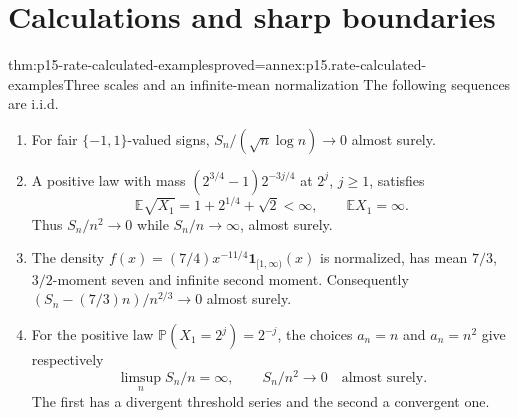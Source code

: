 \section{Calculations and sharp boundaries}
\label{sec:p15-rate-calculations}

\begin{hbtheorem}{thm:p15-rate-calculated-examples}{proved=annex:p15.rate-calculated-examples}{Three scales and an infinite-mean normalization}
The following sequences are i.i.d.
\begin{enumerate}
\item For fair \(\{-1,1\}\)-valued signs,
\(S_n/(\sqrt n\log n)\to0\) almost surely.
\item A positive law with mass
\((2^{3/4}-1)2^{-3j/4}\) at \(2^j\), \(j\geq1\), satisfies
\[
 \mathbb E\sqrt{X_1}=1+2^{1/4}+\sqrt2<\infty,\qquad
 \mathbb EX_1=\infty.
\]
Thus \(S_n/n^2\to0\) while \(S_n/n\to\infty\), almost surely.
\item The density
\(f(x)=(7/4)x^{-11/4}\mathbf1_{[1,\infty)}(x)\)
is normalized, has mean \(7/3\), \(3/2\)-moment seven and infinite
second moment. Consequently
\((S_n-(7/3)n)/n^{2/3}\to0\) almost surely.
\item For the positive law \(\mathbb P(X_1=2^j)=2^{-j}\),
the choices \(a_n=n\) and \(a_n=n^2\) give respectively
\[
 \limsup_n S_n/n=\infty,\qquad S_n/n^2\longrightarrow0
                                  \quad\text{almost surely}.
\]
The first has a divergent threshold series and the second a convergent
one.
\end{enumerate}
\end{hbtheorem}

